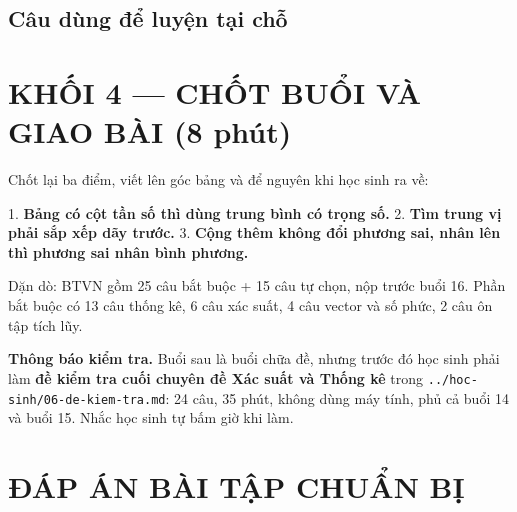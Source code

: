 \documentclass[11pt, a4paper]{article}
\begin{document}
\subsection{Câu dùng để luyện tại chỗ}


\section{KHỐI 4 — CHỐT BUỔI VÀ GIAO BÀI (8 phút)}

Chốt lại ba điểm, viết lên góc bảng và để nguyên khi học sinh ra về:

1. \textbf{Bảng có cột tần số thì dùng trung bình có trọng số.}
2. \textbf{Tìm trung vị phải sắp xếp dãy trước.}
3. \textbf{Cộng thêm không đổi phương sai, nhân lên thì phương sai nhân bình phương.}

Dặn dò: BTVN gồm 25 câu bắt buộc + 15 câu tự chọn, nộp trước buổi 16. Phần bắt buộc có 13 câu thống kê, 6 câu xác suất, 4 câu vector và số phức, 2 câu ôn tập tích lũy.

\textbf{Thông báo kiểm tra.} Buổi sau là buổi chữa đề, nhưng trước đó học sinh phải làm \textbf{đề kiểm tra cuối chuyên đề Xác suất và Thống kê} trong \texttt{../hoc-sinh/06-de-kiem-tra.md}: 24 câu, 35 phút, không dùng máy tính, phủ cả buổi 14 và buổi 15. Nhắc học sinh tự bấm giờ khi làm.

\section{ĐÁP ÁN BÀI TẬP CHUẨN BỊ}
\end{document}

